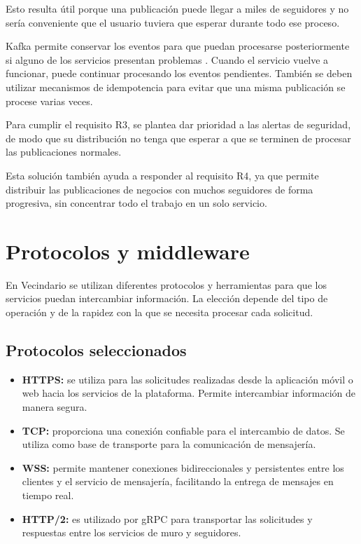 \documentclass[12pt,a4paper]{article}
\begin{document}
Esto resulta útil porque una publicación puede llegar a miles de seguidores y no sería conveniente que el usuario tuviera que esperar durante todo ese proceso.

Kafka permite conservar los eventos para que puedan procesarse posteriormente si alguno de los servicios presentan problemas \cite{kafka}. Cuando el servicio vuelve a funcionar, puede continuar procesando los eventos pendientes. También se deben utilizar mecanismos de idempotencia para evitar que una misma publicación se procese varias veces.

Para cumplir el requisito R3, se plantea dar prioridad a las alertas de seguridad, de modo que su distribución no tenga que esperar a que se terminen de procesar las publicaciones normales.

Esta solución también ayuda a responder al requisito R4, ya que permite distribuir las publicaciones de negocios con muchos seguidores de forma progresiva, sin concentrar todo el trabajo en un solo servicio.





\section{Protocolos y middleware}

En Vecindario se utilizan diferentes protocolos y herramientas
para que los servicios puedan intercambiar información. La
elección depende del tipo de operación y de la rapidez con la
que se necesita procesar cada solicitud.

\subsection{Protocolos seleccionados}

\begin{itemize}

    \item \textbf{HTTPS:} se utiliza para las solicitudes
    realizadas desde la aplicación móvil o web hacia los
    servicios de la plataforma. Permite intercambiar
    información de manera segura.

    \item \textbf{TCP:} proporciona una conexión confiable
    para el intercambio de datos. Se utiliza como base de
    transporte para la comunicación de mensajería.

    \item \textbf{WSS:} permite mantener conexiones
    bidireccionales y persistentes entre los clientes y el
    servicio de mensajería, facilitando la entrega de
    mensajes en tiempo real.

    \item \textbf{HTTP/2:} es utilizado por gRPC para
    transportar las solicitudes y respuestas entre los
    servicios de muro y seguidores.

\end{itemize}
\end{document}
